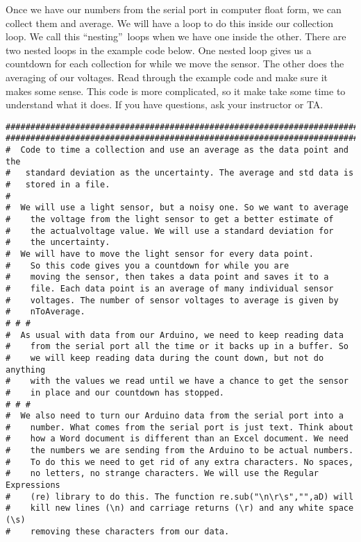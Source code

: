 Once we have our numbers from the serial port in computer float form, we can
collect them and average. We will have a loop to do this inside our
collection loop. We call this \textquotedblleft nesting\textquotedblright\
loops when we have one inside the other. There are two nested loops in the
example code below. One nested loop gives us a countdown for each collection
for while we move the sensor. The other does the averaging of our voltages.
Read through the example code and make sure it makes some sense. This code
is more complicated, so it make take some time to understand what it does.
If you have questions, ask your instructor or TA.
\begin{verbatim}
##########################################################################
##########################################################################
#  Code to time a collection and use an average as the data point and the 
#   standard deviation as the uncertainty. The average and std data is 
#   stored in a file.
#
#  We will use a light sensor, but a noisy one. So we want to average 
#    the voltage from the light sensor to get a better estimate of 
#    the actualvoltage value. We will use a standard deviation for 
#    the uncertainty.
#  We will have to move the light sensor for every data point. 
#    So this code gives you a countdown for while you are 
#    moving the sensor, then takes a data point and saves it to a 
#    file. Each data point is an average of many individual sensor 
#    voltages. The number of sensor voltages to average is given by 
#    nToAverage.
# # # 
#  As usual with data from our Arduino, we need to keep reading data 
#    from the serial port all the time or it backs up in a buffer. So 
#    we will keep reading data during the count down, but not do anything 
#    with the values we read until we have a chance to get the sensor 
#    in place and our countdown has stopped.
# # #
#  We also need to turn our Arduino data from the serial port into a 
#    number. What comes from the serial port is just text. Think about 
#    how a Word document is different than an Excel document. We need 
#    the numbers we are sending from the Arduino to be actual numbers.  
#    To do this we need to get rid of any extra characters. No spaces, 
#    no letters, no strange characters. We will use the Regular Expressions 
#    (re) library to do this. The function re.sub("\n\r\s","",aD) will 
#    kill new lines (\n) and carriage returns (\r) and any white space (\s)
#    removing these characters from our data.
 

\end{verbatim}
